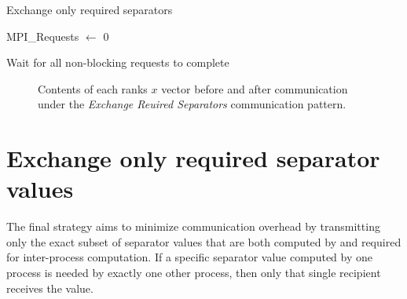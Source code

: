 
\begin{algorithm}[H]
    \label{alg:1ccomm}
    \caption{Exchange only required separators}
    \SetAlgoVlined
    \Output{\newline}

    MPI\_Requests \(\gets\) 0\\
 

    Wait for all non-blocking requests to complete\\
\end{algorithm}


\begin{figure}[ht]
    \centering
    \caption{Contents of each ranks \(x\) vector before and after communication under the \textit{Exchange Reuired Separators} communication pattern.}
    \label{fig:1ccomm}
\end{figure}

\section{Exchange only required separator values}
The final strategy aims to minimize communication overhead by transmitting only the exact subset of separator values that are both computed by and required for inter-process computation. If a specific separator value computed by one process is needed by exactly one other process, then only that single recipient receives the value.

